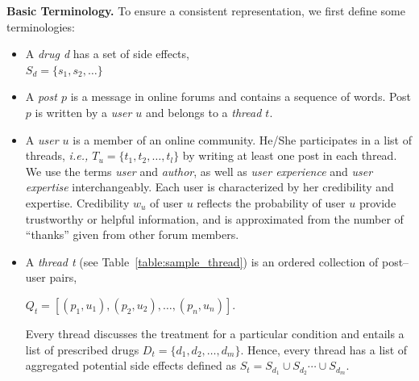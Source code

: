 \documentclass{bmcart}
\begin{document}
{\bf Basic Terminology.} To ensure a consistent representation, 
we first define some terminologies: 

\begin{itemize}
\item A \textit{drug d} has a set of side effects, \\
  $S_d = \{s_1, s_2, \ldots\}$
\item A \textit{post $p$} is a message in online forums and contains a sequence of words. Post $p$ is written by a \textit{user $u$} and belongs to a \textit{thread $t$}.
\item A \textit{user $u$} is a member of an online community. He/She participates in a list of threads, \textit{ i.e., $T_u = \{t_1, t_2, \ldots, t_l\}$} by writing at least one post in each thread.
We use the terms \textit{user} and \textit{author}, as well as \textit{user experience} and \textit{user expertise} interchangeably.
\noindent
Each user is characterized by her credibility and expertise. Credibility $w_u$ of user $u$ reflects the probability of user $u$ provide trustworthy or helpful information, and is approximated from the number of ``thanks'' given from other forum members.

\item A \textit{thread t}
(see Table~\ref{table:sample_thread}) 
is an ordered collection of post--user pairs, 

$Q_t = [\left(p_1, u_1\right), \left(p_2, u_2\right), \ldots, \left(p_n, u_n\right)]$. 

\noindent
Every thread discusses the treatment for a particular condition and entails a list of prescribed drugs 
$D_t=\{d_1, d_2, \ldots, d_m\}$. 
Hence, every thread has a list of aggregated potential side effects defined as $S_t = S_{d_1} \cup S_{d_2} \cdots \cup S_{d_m}$. \\

\end{itemize}
\end{document}
